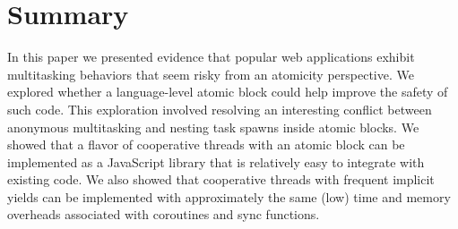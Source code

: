 \documentclass[acmsmall,anonymous,review]{acmart}\settopmatter{printfolios=true,printccs=false,printacmref=false}
\begin{document}



\section{Summary}

In this paper we presented evidence that popular web applications exhibit multitasking behaviors that seem risky from an atomicity perspective.
We explored whether a language-level atomic block could help improve the safety of such code.
This exploration involved resolving an interesting conflict between anonymous multitasking and nesting task spawns inside atomic blocks.
We showed that a flavor of cooperative threads with an atomic block can be implemented as a JavaScript library that is relatively easy to integrate with existing code.
We also showed that cooperative threads with frequent implicit yields can be implemented with approximately the same (low) time and memory overheads associated with coroutines and sync functions.







% 
% 





\end{document}
